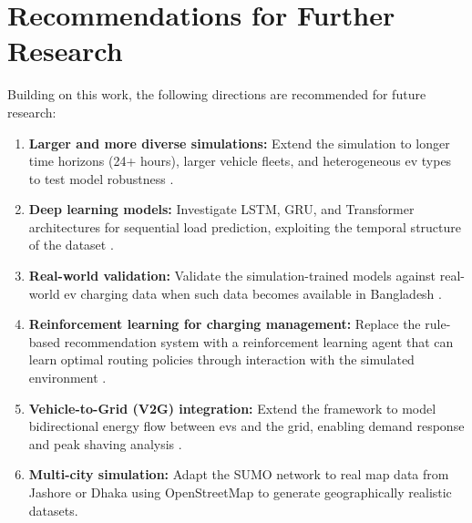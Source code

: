 \documentclass{thesis-library}
\begin{document}
\section{Recommendations for Further Research}

Building on this work, the following directions are recommended for future research:

\begin{enumerate}
  \item \textbf{Larger and more diverse simulations:} Extend the simulation to longer
        time horizons (24+ hours), larger vehicle fleets, and heterogeneous \Gls{ev} types
        to test model robustness \cite{ml_ev_load2021}.
  \item \textbf{Deep learning models:} Investigate LSTM, GRU, and Transformer
        architectures for sequential load prediction, exploiting the temporal structure of
        the dataset \cite{load_prediction_dl2022}.
  \item \textbf{Real-world validation:} Validate the simulation-trained models against
        real-world \Gls{ev} charging data when such data becomes available in Bangladesh
        \cite{ev_bangladesh2023}.
  \item \textbf{Reinforcement learning for charging management:} Replace the rule-based
        recommendation system with a reinforcement learning agent that can learn optimal
        routing policies through interaction with the simulated environment
        \cite{demand_response2023}.
  \item \textbf{Vehicle-to-Grid (V2G) integration:} Extend the framework to model
        bidirectional energy flow between \Gls{ev}s and the grid, enabling demand
        response and peak shaving analysis \cite{smart_charging2022}.
  \item \textbf{Multi-city simulation:} Adapt the SUMO network to real map data from
        Jashore or Dhaka using OpenStreetMap to generate geographically realistic
        datasets.
\end{enumerate}

\cite{app12136490}

\renewcommand{\bibname}{References}


\end{document}
